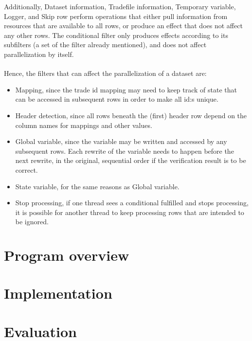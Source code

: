 Additionally, Dataset information, Tradefile information, Temporary variable, Logger, and Skip row perform operations that either pull information from resources that
are available to all rows, or produce an effect that does not affect any other rows. The conditional filter only produces effects according to its subfilters (a set of
the filter already mentioned), and does not affect parallelization by itself.
\\\\
Hence, the filters that can affect the parallelization of a dataset are:
\begin{itemize}
  \item Mapping, since the trade id mapping may need to keep track of state that can be accessed in subsequent rows in order to make all id:s unique.
  \item Header detection, since all rows beneath the (first) header row depend on the column names for mappings and other values.
  \item Global variable, since the variable may be written and accessed by any subsequent rows. Each rewrite of the variable needs to happen before the next rewrite,
    in the original, sequential order if the verification result is to be correct.
  \item State variable, for the same reasons as Global variable.
  \item Stop processing, if one thread sees a conditional fulfilled and stops processing, it is possible for another thread to keep processing rows that are intended
    to be ignored.
\end{itemize}


\section{Program overview}

\section{Implementation}

\section{Evaluation}
